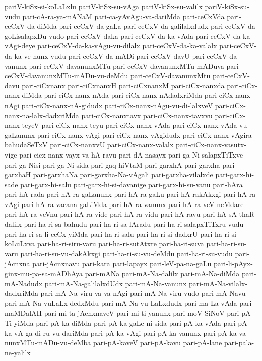 {pariV-kiSx-si-koLaLxlu
pariV-kiSx-su-vAga
pariV-kiSx-su-valilx
pariV-kiSx-su-vudu
pari-cA-ra-ya-mANaM
pari-ca-yAvAgu-va-dariMda
pari-ceCxVda
pari-ceCxV-da-diMda
pari-ceCxV-da-gaLa
pari-ceCxV-da-galilalxdudx
pari-ceCxV-da-goLisalapxDu-vudo
pari-ceCxV-daka
pari-ceCxV-da-ka-vAda
pari-ceCxV-da-ka-vAgi-deye
pari-ceCxV-da-ka-vAgu-vu-dilalx
pari-ceCxV-da-ka-valalx
pari-ceCxV-da-ka-ve-nunx-vudu
pari-ceCxV-da-mADi
pari-ceCxV-davU
pari-ceCxV-da-vanunx
pari-ceCxV-davanunxMTu
pari-ceCxV-davanunxMTu-mADuva
pari-ceCxV-davanunxMTu-mADu-vu-deMdu
pari-ceCxV-davanunxMtu
pari-ceCxV-davu
pari-ciCxnanx
pari-ciCxnanxH
pari-ciCxnanxM
pari-ciCx-nanxda
pari-ciCx-nanx-diMda
pari-ciCx-nanx-nAda
pari-ciCx-nanx-nAdadxriMda
pari-ciCx-nanx-nAgi
pari-ciCx-nanx-nA-gidudx
pari-ciCx-nanx-nAgu-vu-di-lalxveV
pari-ciCx-nanx-na-lalx-dadxriMda
pari-ciCx-nanxtavx
pari-ciCx-nanx-tavxvu
pari-ciCx-nanx-teyeV
pari-ciCx-nanx-teyu
pari-ciCx-nanx-vAda
pari-ciCx-nanx-vAda-vu-gaLanunx
pari-ciCx-nanx-vAgi
pari-ciCx-nanx-vAgidudx
pari-ciCx-nanx-vAgira-bahudaSeTxV
pari-ciCx-nanxvU
pari-ciCx-nanx-valalx
pari-ciCx-nanx-vasutx-vige
pari-cicx-nanx-vayx-va-hA-ravu
pari-dA-nasayx
pari-ga-Ni-salapxTiTxve
pari-ga-Nisi
pari-ga-Ni-sida
pari-gaq-hiVtaM
pari-garxhA
pari-garxha
pari-garxhaH
pari-garxhaNa
pari-garxha-Na-vAgali
pari-garxha-vilalxde
pari-garx-hi-sade
pari-garx-hi-salu
pari-garx-hi-si-davanige
pari-garx-hi-su-vanu
pari-hAra
pari-hA-rada
pari-hA-ra-gaLanunx
pari-hA-ra-gaLu
pari-hA-rakAkxgi
pari-hA-ra-vAgi
pari-hA-ra-vacana-gaLiMda
pari-hA-ra-vanunx
pari-hA-ra-veV-neMdare
pari-hA-ra-veVnu
pari-hA-ra-vide
pari-hA-ra-vidu
pari-hA-ravu
pari-hA-sA-thaR-dalilx
pari-ha-ri-sa-bahudu
pari-ha-ri-sa-lAradu
pari-ha-ri-salapxTiTxru-vudu
pari-ha-ri-sa-li-ceCx-yiMda
pari-ha-ri-salu
pari-ha-ri-si-dadxrU
pari-ha-ri-si-koLuLxva
pari-ha-ri-siru-varu
pari-ha-ri-sutAtxre
pari-ha-ri-suva
pari-ha-ri-su-varu
pari-ha-ri-su-vu-dakAkxgi
pari-ha-ri-su-vu-deMdu
pari-ha-ri-su-vudu
pari-jAcnxna
pari-jAcnxnavu
pari-kara
pari-lapayx
pari-leV-pa-na-gaLu
pari-li-pAyx-ginx-mu-pa-sa-mADhAya
pari-mANa
pari-mA-Na-dalilx
pari-mA-Na-diMda
pari-mA-Nadudx
pari-mA-Na-galilalxdUdx
pari-mA-Na-vanunx
pari-mA-Na-vilalx-dadxriMda
pari-mA-Na-viru-va-va-nAgi
pari-mA-Na-viru-vudo
pari-mA-Navu
pari-mA-Na-vuLaLx-dedxMdu
pari-mA-Na-vu-LaLxdudx
pari-ma-La-vAda
pari-maMDalAH
pari-mi-ta-jAcnxnaveV
pari-mi-ti-yanunx
pari-moV-SiNoV
pari-pA-Ti-yiMda
pari-pA-ka-diMda
pari-pA-ka-gaLe-ni-sida
pari-pA-ka-vAda
pari-pA-ka-vA-ga-di-ru-vu-dariMda
pari-pA-ka-vAgi
pari-pA-ka-vanunx
pari-pA-ka-va-nunxMTu-mADu-vu-deMba
pari-pA-kaveV
pari-pA-kavu
pari-pA-lane
pari-pala-ne-yalilx
}
